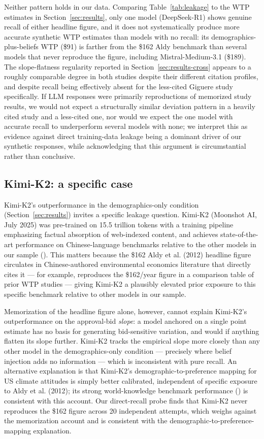 \documentclass[12pt]{article}
\begin{document}
Neither pattern holds in our data. Comparing Table~\ref{tab:leakage} to the WTP estimates in Section~\ref{sec:results}, only one model (DeepSeek-R1) shows genuine recall of either headline figure, and it does not systematically produce more accurate synthetic WTP estimates than models with no recall: its demographics-plus-beliefs WTP (\$91) is farther from the \$162 Aldy benchmark than several models that never reproduce the figure, including Mistral-Medium-3.1 (\$189). The slope-flatness regularity reported in Section~\ref{sec:results-cross} appears to a roughly comparable degree in both studies despite their different citation profiles, and despite recall being effectively absent for the less-cited Giguere study specifically. If LLM responses were primarily reproductions of memorized study results, we would not expect a structurally similar deviation pattern in a heavily cited study and a less-cited one, nor would we expect the one model with accurate recall to underperform several models with none; we interpret this as evidence against direct training-data leakage being a dominant driver of our synthetic responses, while acknowledging that this argument is circumstantial rather than conclusive.

\subsection{Kimi-K2: a specific case}

Kimi-K2's outperformance in the demographics-only condition (Section~\ref{sec:results}) invites a specific leakage question. Kimi-K2 (Moonshot AI, July 2025) was pre-trained on 15.5 trillion tokens with a training pipeline emphasizing factual absorption of web-indexed content, and achieves state-of-the-art performance on Chinese-language benchmarks relative to the other models in our sample (\textcite{KimiTeam2025}). This matters because the \$162 Aldy et al. (2012) headline figure circulates in Chinese-authored environmental economics literature that directly cites it --- for example, \textcite{Hao2025Shenzhen} reproduces the \$162/year figure in a comparison table of prior WTP studies --- giving Kimi-K2 a plausibly elevated prior exposure to this specific benchmark relative to other models in our sample.

Memorization of the headline figure alone, however, cannot explain Kimi-K2's outperformance on the approval-bid \emph{slope}: a model anchored on a single point estimate has no basis for generating bid-sensitive variation, and would if anything flatten its slope further. Kimi-K2 tracks the empirical slope more closely than any other model in the demographics-only condition --- precisely where belief injection adds no information --- which is inconsistent with pure recall. An alternative explanation is that Kimi-K2's demographic-to-preference mapping for US climate attitudes is simply better calibrated, independent of specific exposure to Aldy et al. (2012); its strong world-knowledge benchmark performance (\textcite{KimiTeam2025}) is consistent with this account. Our direct-recall probe finds that Kimi-K2 never reproduces the \$162 figure across 20 independent attempts, which weighs against the memorization account and is consistent with the demographic-to-preference-mapping explanation.
\end{document}
